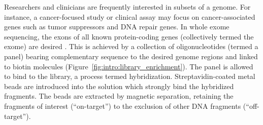 Researchers and clinicians are frequently interested in subsets of a genome. For instance, a cancer-focused study or clinical assay may focus on cancer-associated genes such as tumor suppressors and DNA repair genes. In whole exome sequencing, the exons of all known protein-coding genes (collectively termed the exome) are desired \cite{choi2009}. This is achieved by a collection of oligonucleotides (termed a panel) bearing complementary sequence to the desired genome regions and linked to biotin molecules (Figure~\ref{fig:intro:library_enrichment}). The panel is allowed to bind to the library, a process termed hybridization. Streptavidin-coated metal beads are introduced into the solution which strongly bind the hybridized fragments. The beads are extracted by magnetic separation, retaining the fragments of interest (``on-target'') to the exclusion of other DNA fragments (``off-target'').

